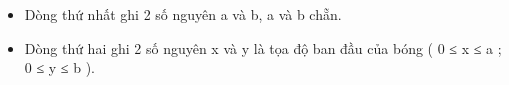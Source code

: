 \begin{itemize}
	\item     Dòng thứ nhất ghi 2 số nguyên a và b, a và b chẵn.   
	\item     Dòng thứ hai ghi 2 số nguyên x và y là tọa độ ban đầu của bóng ( 0 ≤ x ≤ a ; 0 ≤ y ≤ b ).   
\end{itemize}